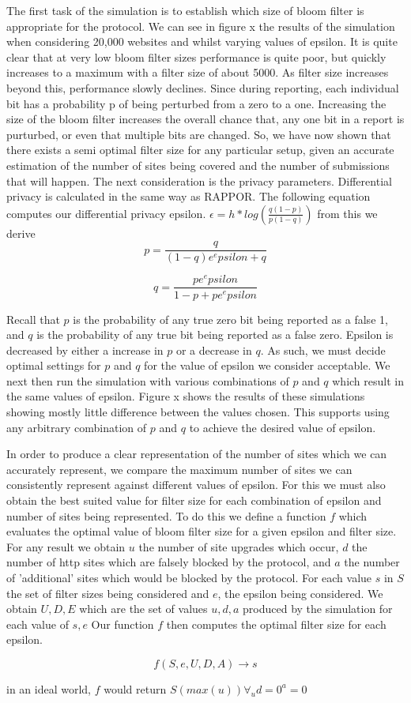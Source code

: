 \documentclass[11pt]{article}
\begin{document}
The first task of the simulation is to establish which size of bloom filter is appropriate for the protocol. We can see in figure x the results of the simulation when considering 20,000 websites and whilst varying values of epsilon. It is quite clear that at very low bloom filter sizes performance is quite poor, but quickly increases to a maximum with a filter size of about 5000. As filter size increases beyond this, performance slowly declines. Since during reporting, each individual bit has a probability p of being perturbed from a zero to a one. Increasing the size of the bloom filter increases the overall chance that, any one bit in a report is purturbed, or even that multiple bits are changed. So, we have now shown that there exists a semi optimal filter size for any particular setup, given an accurate estimation of the number of sites being covered and the number of submissions that will happen. The next consideration is the privacy parameters. Differential privacy is calculated in the same way as RAPPOR. The following equation computes our differential privacy epsilon. \(\epsilon = h * log(\frac{q(1-p)}{p(1-q)})\) from this we derive $$p = \frac{q}{(1-q)e^epsilon + q}$$

$$q = \frac{p e^epsilon}{1-p+pe^epsilon}$$

Recall that \(p\) is the probability of any true zero bit being reported as a false 1, and \(q\) is the probability of any true bit being reported as a false zero. Epsilon is decreased by either a increase in \(p\) or a decrease in \(q\). As such, we must decide optimal settings for \(p\) and \(q\) for the value of epsilon we consider acceptable. We next then run the simulation with various combinations of \(p\) and \(q\) which result in the same values of epsilon. Figure x shows the results of these simulations showing mostly little difference between the values chosen. This supports using any arbitrary combination of \(p\) and \(q\) to achieve the desired value of epsilon.

In order to produce a clear representation of the number of sites which we can accurately represent, we compare the maximum number of sites we can consistently represent against different values of epsilon. For this we must also obtain the best suited value for filter size for each combination of epsilon and number of sites being represented. To do this we define a function \(f\) which evaluates the optimal value of bloom filter size for a given epsilon and filter size. For any result we obtain \(u\) the number of site upgrades which occur, \(d\) the number of http sites which are falsely blocked by the protocol, and \(a\) the number of 'additional' sites which would be blocked by the protocol.
For each value \(s\) in \(S\) the set of filter sizes being considered and \(e\), the epsilon being considered. We obtain \(U,D,E\) which are the set of values \(u,d,a\) produced by the simulation for each value of \(s,e\)
Our function \(f\) then computes the optimal filter size for each epsilon.

$$f(S,e,U,D,A) \to s$$

in an ideal world, \(f\) would return \(S(max(u)) \forall_u d=0 ^ a=0\)
\end{document}
